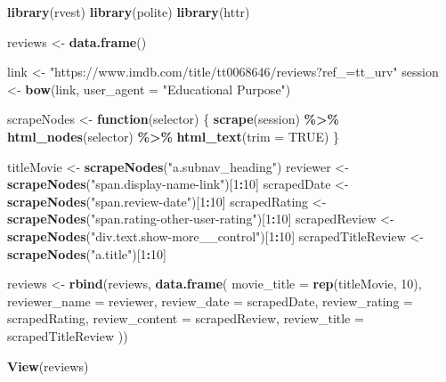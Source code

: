 \documentclass[
]{article}
\newenvironment{Shaded}{\begin{snugshade}}{\end{snugshade}}
\newcommand{\AttributeTok}[1]{\textcolor[rgb]{0.13,0.29,0.53}{#1}}
\newcommand{\ConstantTok}[1]{\textcolor[rgb]{0.56,0.35,0.01}{#1}}
\newcommand{\ControlFlowTok}[1]{\textcolor[rgb]{0.13,0.29,0.53}{\textbf{#1}}}
\newcommand{\DecValTok}[1]{\textcolor[rgb]{0.00,0.00,0.81}{#1}}
\newcommand{\FunctionTok}[1]{\textcolor[rgb]{0.13,0.29,0.53}{\textbf{#1}}}
\newcommand{\NormalTok}[1]{#1}
\newcommand{\OtherTok}[1]{\textcolor[rgb]{0.56,0.35,0.01}{#1}}
\newcommand{\SpecialCharTok}[1]{\textcolor[rgb]{0.81,0.36,0.00}{\textbf{#1}}}
\newcommand{\StringTok}[1]{\textcolor[rgb]{0.31,0.60,0.02}{#1}}
\begin{document}
\begin{Shaded}
\begin{Highlighting}[]
\FunctionTok{library}\NormalTok{(rvest)}
\FunctionTok{library}\NormalTok{(polite)}
\FunctionTok{library}\NormalTok{(httr)}


\NormalTok{reviews }\OtherTok{\textless{}{-}} \FunctionTok{data.frame}\NormalTok{()}

\NormalTok{link }\OtherTok{\textless{}{-}} \StringTok{"https://www.imdb.com/title/tt0068646/reviews?ref\_=tt\_urv"}
\NormalTok{session }\OtherTok{\textless{}{-}} \FunctionTok{bow}\NormalTok{(link, }\AttributeTok{user\_agent =} \StringTok{"Educational Purpose"}\NormalTok{)}

\NormalTok{scrapeNodes }\OtherTok{\textless{}{-}} \ControlFlowTok{function}\NormalTok{(selector) \{}
  \FunctionTok{scrape}\NormalTok{(session) }\SpecialCharTok{\%\textgreater{}\%}
    \FunctionTok{html\_nodes}\NormalTok{(selector) }\SpecialCharTok{\%\textgreater{}\%}
    \FunctionTok{html\_text}\NormalTok{(}\AttributeTok{trim =} \ConstantTok{TRUE}\NormalTok{)}
\NormalTok{\}}

\NormalTok{titleMovie }\OtherTok{\textless{}{-}} \FunctionTok{scrapeNodes}\NormalTok{(}\StringTok{"a.subnav\_heading"}\NormalTok{)}
\NormalTok{reviewer }\OtherTok{\textless{}{-}} \FunctionTok{scrapeNodes}\NormalTok{(}\StringTok{"span.display{-}name{-}link"}\NormalTok{)[}\DecValTok{1}\SpecialCharTok{:}\DecValTok{10}\NormalTok{]}
\NormalTok{scrapedDate }\OtherTok{\textless{}{-}} \FunctionTok{scrapeNodes}\NormalTok{(}\StringTok{"span.review{-}date"}\NormalTok{)[}\DecValTok{1}\SpecialCharTok{:}\DecValTok{10}\NormalTok{]}
\NormalTok{scrapedRating }\OtherTok{\textless{}{-}} \FunctionTok{scrapeNodes}\NormalTok{(}\StringTok{"span.rating{-}other{-}user{-}rating"}\NormalTok{)[}\DecValTok{1}\SpecialCharTok{:}\DecValTok{10}\NormalTok{]}
\NormalTok{scrapedReview }\OtherTok{\textless{}{-}} \FunctionTok{scrapeNodes}\NormalTok{(}\StringTok{"div.text.show{-}more\_\_control"}\NormalTok{)[}\DecValTok{1}\SpecialCharTok{:}\DecValTok{10}\NormalTok{]}
\NormalTok{scrapedTitleReview }\OtherTok{\textless{}{-}} \FunctionTok{scrapeNodes}\NormalTok{(}\StringTok{"a.title"}\NormalTok{)[}\DecValTok{1}\SpecialCharTok{:}\DecValTok{10}\NormalTok{]}

\NormalTok{reviews }\OtherTok{\textless{}{-}} \FunctionTok{rbind}\NormalTok{(reviews, }\FunctionTok{data.frame}\NormalTok{(}
  \AttributeTok{movie\_title =} \FunctionTok{rep}\NormalTok{(titleMovie, }\DecValTok{10}\NormalTok{),}
  \AttributeTok{reviewer\_name =}\NormalTok{ reviewer,}
  \AttributeTok{review\_date =}\NormalTok{ scrapedDate,}
  \AttributeTok{review\_rating =}\NormalTok{ scrapedRating,}
  \AttributeTok{review\_content =}\NormalTok{ scrapedReview,}
  \AttributeTok{review\_title =}\NormalTok{ scrapedTitleReview}
\NormalTok{))}

\FunctionTok{View}\NormalTok{(reviews)}
\end{Highlighting}
\end{Shaded}
\end{document}

